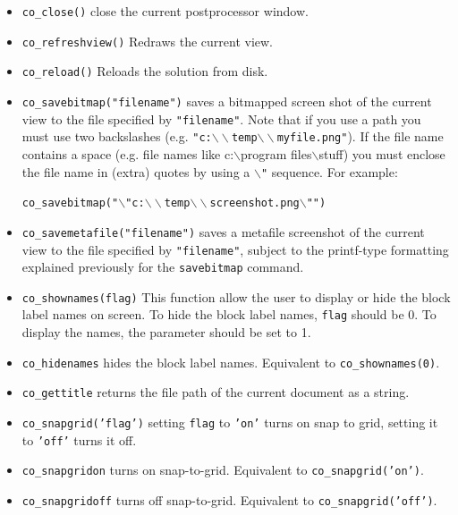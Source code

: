 \begin{itemize}

\item \texttt{co\_close()} close the current postprocessor window.

\item{\tt co\_refreshview()} Redraws the current view.

\item{\tt co\_reload()} Reloads the solution from disk.

\item \texttt{co\_savebitmap("filename")} saves a bitmapped screen shot of the current
view to the file specified by \texttt{"filename"}. Note that if you
use a path you must use two backslashes (e.g.
\texttt{"c:$\backslash \backslash $temp$\backslash \backslash
$myfile.png"}). If the file name contains a space (e.g. file
names like c:$\backslash $program files$\backslash $stuff) you must
enclose the file name in (extra) quotes by using a
\texttt{$\backslash $"} sequence. For example:

\texttt{co\_savebitmap("$\backslash $"c:$\backslash \backslash
$temp$\backslash \backslash $screenshot.png$\backslash $"")}

\item \texttt{co\_savemetafile("filename")} saves a metafile screenshot of the current
view to the file specified by \texttt{"filename"}, subject to the
printf-type formatting explained previously for the
\texttt{savebitmap} command.

\item \texttt{co\_shownames(flag)} This function allow the user to display or hide the
block label names on screen. To hide the block label names,
\texttt{flag} should be 0. To display the names, the parameter
should be set to 1.

\item{\tt co\_hidenames} hides the block label names. Equivalent to {\tt co\_shownames(0)}.

\item{\tt co\_gettitle} returns the file path of the current document as a string.

\item{\tt co\_snapgrid('flag')} setting {\tt flag} to {\tt 'on'} turns on snap to grid, setting it to {\tt 'off'} turns it off.

\item{\tt co\_snapgridon} turns on snap-to-grid. Equivalent to {\tt co\_snapgrid('on')}.

\item{\tt co\_snapgridoff} turns off snap-to-grid. Equivalent to {\tt co\_snapgrid('off')}.


\end{itemize}
